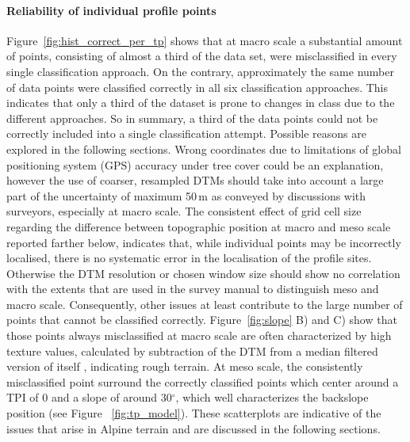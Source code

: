 \documentclass[preprint,12pt,authoryear]{elsarticle}
\begin{document}
\paragraph{Reliability of individual profile points} 
Figure~\ref{fig:hist_correct_per_tp} shows that at macro scale a substantial amount of points, consisting of almost a third of the data set, were misclassified in every single classification approach. On the contrary, approximately the same number of data points were classified correctly in all six classification approaches. This indicates that only a third of the dataset is prone to changes in class due to the different approaches. So in summary, a third of the data points could not be correctly included into a single classification attempt. Possible reasons are explored in the following sections. Wrong coordinates due to limitations of global positioning system (GPS) accuracy under tree cover could be an explanation, however the use of coarser, resampled DTMs should take into account a large part of the uncertainty of maximum 50\,m as conveyed by discussions with surveyors, especially at macro scale. The consistent effect of grid cell size regarding the difference between topographic position at macro and meso scale reported farther below, indicates that, while individual points may be incorrectly localised, there is no systematic error in the localisation of the profile sites. Otherwise the DTM resolution or chosen window size should show no correlation with the extents that are used in the survey manual to distinguish meso and macro scale. Consequently, other issues at least contribute to the large number of points that cannot be classified correctly. Figure~\ref{fig:slope} B) and C) show that those points always misclassified at macro scale are often characterized by high texture values, calculated by subtraction of the DTM from a median filtered version of itself \citep{Iwahashi2007}, indicating rough terrain. At meso scale, the consistently misclassified point surround the correctly classified points which center around a TPI of 0 and a slope of around 30$^{\circ}$, which well characterizes the backslope position (see Figure~ \ref{fig:tp_model}). These scatterplots are indicative of the issues that arise in Alpine terrain and are discussed in the following sections.
\end{document}
